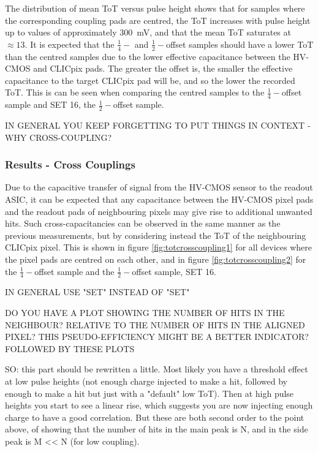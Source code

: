 The distribution of mean ToT versus pulse height shows that for samples where the corresponding coupling pads are centred, the ToT increases with pulse height up to values of approximately 300~mV, and that the mean ToT saturates at $\approx 13$.  It is expected that the $\frac{1}{4}-$ and $\frac{1}{2}-$offset samples should have a lower ToT than the centred samples due to the lower effective capacitance between the HV-CMOS and CLICpix pads.  The greater the offset is, the smaller the effective capacitance to the target CLICpix pad will be, and so the lower the recorded ToT.  This is can be seen when comparing the centred samples to the $\frac{1}{4}-$offset sample and SET 16, the $\frac{1}{2}-$offset sample.  

IN GENERAL YOU KEEP FORGETTING TO PUT THINGS IN CONTEXT - WHY CROSS-COUPLING?

\subsubsection{Results -  Cross Couplings}

Due to the capacitive transfer of signal from the HV-CMOS sensor to the readout ASIC, it can be expected that any capacitance between the HV-CMOS pixel pads and the readout pads of neighbouring pixels may give rise to additional unwanted hits. Such cross-capacitancies can be observed in the same manner as the previous measurements, but by considering instead the ToT of the neighbouring CLICpix pixel. This is shown in figure \ref{fig:totcrosscoupling1} for all devices where the pixel pads are centred on each other, and in figure \ref{fig:totcrosscoupling2} for the $\frac{1}{4}-$offset sample and the $\frac{1}{2}-$offset sample, SET 16.  

IN GENERAL USE "SET" INSTEAD OF "SET"

DO YOU HAVE A PLOT SHOWING THE NUMBER OF HITS IN THE NEIGHBOUR? RELATIVE TO THE NUMBER OF HITS IN THE ALIGNED PIXEL? THIS PSEUDO-EFFICIENCY MIGHT BE A BETTER INDICATOR? FOLLOWED BY THESE PLOTS

SO: this part should be rewritten a little. Most likely you have a threshold effect at low pulse heights (not enough charge injected to make a hit, followed by enough to make a hit but just with a "default" low ToT). Then at high pulse heights you start to see a linear rise, which suggests you are now injecting enough charge to have a good correlation. But these are both second order to the point above, of showing that the number of hits in the main peak is N, and in the side peak is M << N (for low coupling).

